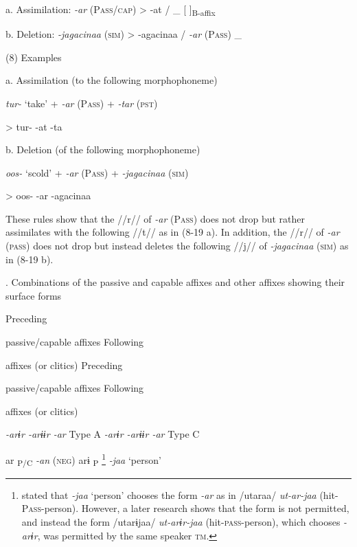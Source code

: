   a.  Assimilation:  \textit{{}-ar} (P\textsc{ass}/\textsc{cap})  >  {}-at  /  \_  [  ]\textsubscript{B-affix}

  b.  Deletion:  \textit{{}-jagacinaa} (\textsc{sim})  >  {}-agacinaa  /  \textit{{}-ar} (P\textsc{ass})  \_

(8)  Examples

  a.  Assimilation (to the following morphophoneme)

      \textit{tur-}  ‘take’  +  \textit{{}-ar} (P\textsc{ass})  +  \textit{{}-tar} (\textsc{pst})

    >  tur-      {}-at      {}-ta  

  b.  Deletion (of the following morphophoneme)

      \textit{oos-}  ‘scold’  +  \textit{{}-ar} (P\textsc{ass})  +  \textit{{}-jagacinaa} (\textsc{sim})

    >  oos-      {}-ar      {}-agacinaa  

These rules show that the //r// of \textit{{}-ar} (P\textsc{ass}) does not drop but rather assimilates with the following //t// as in (8-19 a). In addition, the //r// of \textit{{}-ar} (\textsc{pass}) does not drop but instead deletes the following //j// of \textit{{}-jagacinaa} (\textsc{sim}) as in (8-19 b).

\begin{styleBeschriftung}
\textmd{. Combinations of the passive and capable affixes and other affixes showing their surface forms}
\end{styleBeschriftung}

Preceding

passive/capable affixes  Following

affixes (or clitics)    Preceding

passive/capable affixes  Following

affixes (or clitics)

\textit{{}-arɨr  {}-arɨɨr  {}-ar} Type A    \textit{{}-arɨr  {}-arɨɨr  {}-ar} Type C

    ar\textsubscript{ P/C}  \textit{{}-an} (\textsc{neg})    arɨ\textsubscript{ P}\textstyleFootnoteSymbol{} \footnote{\citet[70]{Niinaga2010} stated that \textit{{}-jaa} ‘person’ chooses the form \textit{{}-ar} as in /utaraa/ \textit{ut-ar-jaa} (hit-P\textsc{ass}-person). However, a later research shows that the form is not permitted, and instead the form /utarɨjaa/ \textit{ut-arɨr-jaa} (hit-\textsc{pass}-person), which chooses \textit{{}-arɨr}, was permitted by the same speaker \textsc{tm}.}      \textit{{}-jaa} ‘person’

